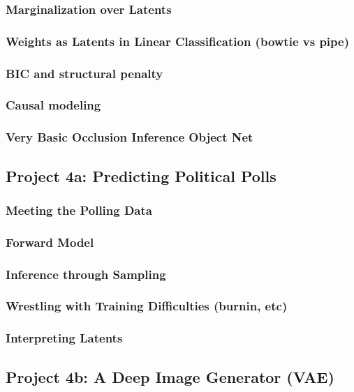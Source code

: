 \documentclass[12pt]{article}
\begin{document}
      \subsubsection*{Marginalization over Latents}
      \subsubsection*{Weights as Latents in Linear Classification (bowtie vs pipe)}
      \subsubsection*{BIC and structural penalty}
      \subsubsection*{Causal modeling}
      \subsubsection*{Very Basic Occlusion Inference Object Net}
    \newpage

    \subsection*{Project 4a: Predicting Political Polls}
      \subsubsection*{Meeting the Polling Data}
      \subsubsection*{Forward Model}
      \subsubsection*{Inference through Sampling}
      \subsubsection*{Wrestling with Training Difficulties (burnin, etc)}
      \subsubsection*{Interpreting Latents}
    \newpage


    \subsection*{Project 4b: A Deep Image Generator (VAE)}
\end{document}
